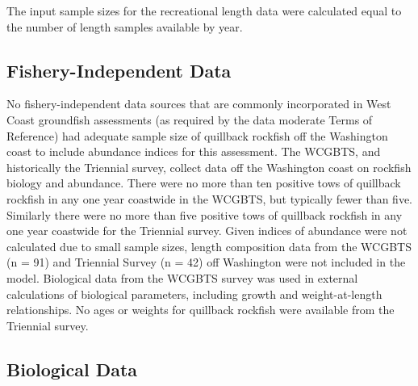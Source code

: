 \documentclass[11pt,
  english,
  a4paper,
]{article}
\begin{document}
\leavevmode\tagmcend\tagstructend\par


The input sample sizes for the recreational length data were calculated equal to the number of length samples available by year.

\leavevmode\tagmcend\tagstructend\par


\hypertarget{fishery-independent-data}{%
\subsection{Fishery-Independent Data}\label{fishery-independent-data}}

\leavevmode\tagmcend\tagstructend


No fishery-independent data sources that are commonly incorporated in West Coast groundfish assessments (as required by the data moderate Terms of Reference) had adequate sample size of quillback rockfish off the Washington coast to include abundance indices for this assessment. The WCGBTS, and historically the Triennial survey, collect data off the Washington coast on rockfish biology and abundance. There were no more than ten positive tows of quillback rockfish in any one year coastwide in the WCGBTS, but typically fewer than five. Similarly there were no more than five positive tows of quillback rockfish in any one year coastwide for the Triennial survey. Given indices of abundance were not calculated due to small sample sizes, length composition data from the WCGBTS (n = 91) and Triennial Survey (n = 42) off Washington were not included in the model. Biological data from the WCGBTS survey was used in external calculations of biological parameters, including growth and weight-at-length relationships. No ages or weights for quillback rockfish were available from the Triennial survey.

\leavevmode\tagmcend\tagstructend\par


\hypertarget{biological-data}{%
\subsection{Biological Data}\label{biological-data}}
\end{document}
